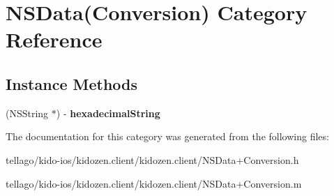 \hypertarget{category_n_s_data_07_conversion_08}{\section{N\-S\-Data(Conversion) Category Reference}
\label{category_n_s_data_07_conversion_08}
}
\subsection*{Instance Methods}
\begin{DoxyCompactItemize}
\item 
\hypertarget{category_n_s_data_07_conversion_08_a1916bafdae8b0b7c109f336b535e643b}{(N\-S\-String $\ast$) -\/ {\bfseries hexadecimal\-String}}\label{category_n_s_data_07_conversion_08_a1916bafdae8b0b7c109f336b535e643b}

\end{DoxyCompactItemize}


The documentation for this category was generated from the following files\-:\begin{DoxyCompactItemize}
\item 
tellago/kido-\/ios/kidozen.\-client/kidozen.\-client/N\-S\-Data+\-Conversion.\-h\item 
tellago/kido-\/ios/kidozen.\-client/kidozen.\-client/N\-S\-Data+\-Conversion.\-m\end{DoxyCompactItemize}
